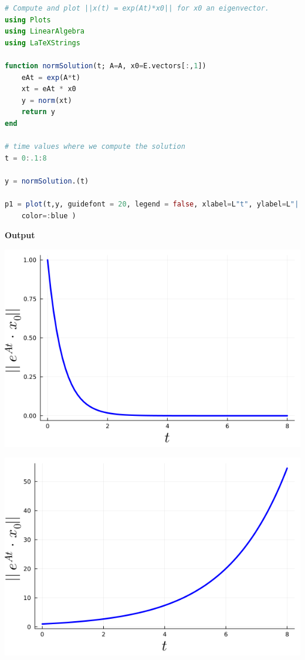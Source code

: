 \begin{lstlisting}[language=Julia,style=mystyle]
# Compute and plot ||x(t) = exp(At)*x0|| for x0 an eigenvector.
using Plots
using LinearAlgebra
using LaTeXStrings

function normSolution(t; A=A, x0=E.vectors[:,1])
    eAt = exp(A*t)
    xt = eAt * x0
    y = norm(xt)
    return y
end

# time values where we compute the solution
t = 0:.1:8

y = normSolution.(t)

p1 = plot(t,y, guidefont = 20, legend = false, xlabel=L"t", ylabel=L"||e^{At}\cdot x_0 ||", lw=3, 
    color=:blue )
\end{lstlisting}
\textbf{Output} 
\begin{center}
    \begin{minipage}{0.45\columnwidth}
        \includegraphics[width=\linewidth]{graphics/Chap09/NormSolutionX0equalsComplexEigenvector1.png}
    \end{minipage}
    \hfill
    \begin{minipage}{0.45\columnwidth}
        \includegraphics[width=\linewidth]{graphics/Chap09/NormSolutionX0equalsComplexEigenvector2.png}
    \end{minipage}
\end{center}
